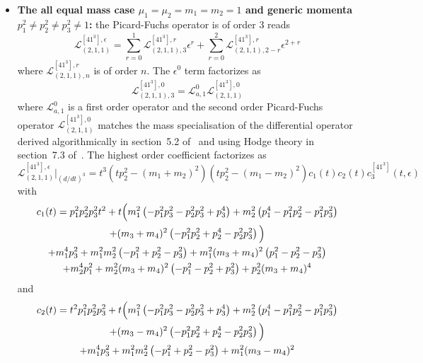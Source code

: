 \documentclass[a4paper,12pt]{article}
\numberwithin{equation}{section}
\numberwithin{figure}{section}
\begin{document}
\begin{itemize}
  \item \textbf{ The all equal mass case
  $\mu_1=\mu_2=m_1=m_2=1$ and generic momenta $p_1^2\neq p_2^2\neq
  p_3^2\neq 1$:} the Picard-Fuchs operator is of order 3
  reads
  \begin{equation}
       \mathscr{L}_{(2,1,1)}^{[41^3],\epsilon}=\sum_{r=0}^1
       \mathscr{L}_{(2,1,1),3}^{[41^3],r} \epsilon^r+ \sum_{r=0}^2   \mathscr{L}_{(2,1,1),2-r}^{[41^3],r} \epsilon^{2+r}
     \end{equation}
     where $ \mathscr{L}_{(2,1,1),n}^{[41^3],r}$  is of order $n$. The
     $\epsilon^0$ term factorizes as
     \begin{equation}
           \mathscr{L}_{(2,1,1),3}^{[41^3],0}=\mathscr{L}_{a,1}^0 \mathscr{L}_{(2,1,1)}^{[41^3],0}      
         \end{equation}
         where $\mathscr{L}_{a,1}^0$ is a first order operator   and the second order
         Picard-Fuchs operator  $\mathscr{L}_{(2,1,1)}^{[41^3] ,0}
         $ matches the mass specialisation of the differential
         operator derived algorithmically in section~5.2
         of~\cite{Lairez:2022zkj} and using Hodge theory in
         section~7.3 of~\cite{Doran:2023yzu}.
         The highest order coefficient factorizes as
         \begin{equation}
                     \mathscr{L}_{(2,1,1)}^{[41^3],\epsilon}\Big|_{(d/dt)^3}=t^3(tp_2^2-(m_1+m_2)^2)(tp_2^2-(m_1-m_2)^2) c_1(t) c_2(t)c^{[41^3]}_3(t,\epsilon)   
                   \end{equation}
                   with
                   \begin{multline}
   c_1(t)=   p_{1}^2 p_{2}^2 p_{3}^2 t^2 +t\Big(m_{1}^2 \left(-p_{1}^2 p_{3}^2-p_{2}^2 p_{3}^2+p_{3}^4\right)+m_{2}^2 \left(p_{1}^4-p_{1}^2
   p_{2}^2-p_{1}^2 p_{3}^2\right)\cr+(m_{3}+m_{4})^2
 \left(-p_{1}^2 p_{2}^2+p_{2}^4-p_{2}^2
   p_{3}^2\right)\Big)\cr
+m_{1}^4 p_{3}^2+m_{1}^2 m_{2}^2 \left(-p_{1}^2+p_{2}^2-p_{3}^2\right)+m_{1}^2 (m_{3}+m_{4})^2
   \left(p_{1}^2-p_{2}^2-p_{3}^2\right)\cr+m_{2}^4 p_{1}^2+m_{2}^2 (m_{3}+m_{4})^2
   \left(-p_{1}^2-p_{2}^2+p_{3}^2\right)+p_{2}^2 (m_{3}+m_{4})^4
 \end{multline}
 and
 \begin{multline}
   c_2(t)=t^2 p_{1}^2 p_{2}^2 p_{3}^2+t\Big(m_{1}^2 \left(-p_{1}^2 p_{3}^2-p_{2}^2 p_{3}^2+p_{3}^4\right)+m_{2}^2 \left(p_{1}^4-p_{1}^2
   p_{2}^2-p_{1}^2 p_{3}^2\right)\cr+(m_{3}-m_{4})^2 \left(-p_{1}^2 p_{2}^2+p_{2}^4-p_{2}^2 p_{3}^2\right)\Big)\cr
    +m_{1}^4 p_{3}^2+m_{1}^2 m_{2}^2 \left(-p_{1}^2+p_{2}^2-p_{3}^2\right)+m_{1}^2 (m_{3}-m_{4})^2

\end{multline}
\end{itemize}
\end{document}
